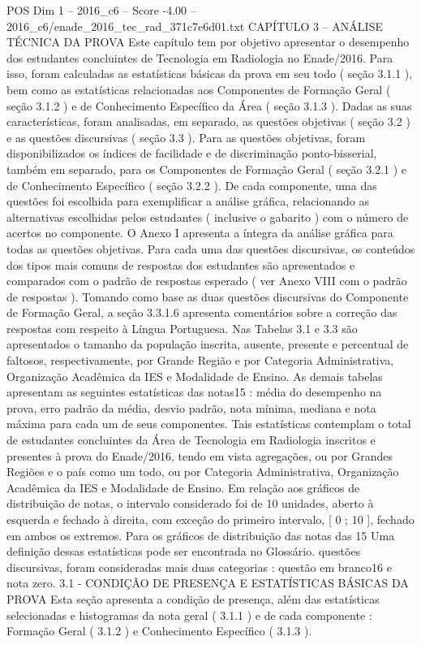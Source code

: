 \begin{textsample}{POS Dim 1 – 2016\_c6 – Score -4.00 – 2016\_c6/enade\_2016\_tec\_rad\_371c7e6d01.txt}  \label{ex:f1_pos_393}
CAPÍTULO 3 – ANÁLISE TÉCNICA DA PROVA Este capítulo tem por objetivo apresentar o desempenho dos estudantes concluintes de Tecnologia em Radiologia no Enade/2016.
Para isso, foram calculadas as estatísticas básicas da prova em seu todo ( seção 3.1.1 ), bem como as estatísticas relacionadas aos Componentes de Formação Geral ( seção 3.1.2 ) e de Conhecimento Específico da Área ( seção 3.1.3 ).
Dadas as suas características, foram analisadas, em separado, as questões objetivas ( seção 3.2 ) e as questões discursivas ( seção 3.3 ).
Para as questões objetivas, foram disponibilizados os índices de facilidade e de discriminação ponto-bisserial, também em separado, para os Componentes de Formação Geral ( seção 3.2.1 ) e de Conhecimento Específico ( seção 3.2.2 ).
De cada componente, uma das questões foi escolhida para exemplificar a análise gráfica, relacionando as alternativas escolhidas pelos estudantes ( inclusive o gabarito ) com o número de acertos no componente.
O Anexo I apresenta a íntegra da análise gráfica para todas as questões objetivas.
Para cada uma das questões discursivas, os conteúdos dos tipos mais comuns de respostas dos estudantes são apresentados e comparados com o padrão de respostas esperado ( ver Anexo VIII com o padrão de respostas ).
Tomando como base as duas questões discursivas do Componente de Formação Geral, a seção 3.3.1.6 apresenta comentários sobre a correção das respostas com respeito à Língua Portuguesa.
Nas Tabelas 3.1 e 3.3 são apresentados o tamanho da população inscrita, ausente, presente e percentual de faltosos, respectivamente, por Grande Região e por Categoria Administrativa, Organização Acadêmica da IES e Modalidade de Ensino.
As demais tabelas apresentam as seguintes estatísticas das notas15 : média do desempenho na prova, erro padrão da média, desvio padrão, nota mínima, mediana e nota máxima para cada um de seus componentes.
Tais estatísticas contemplam o total de estudantes concluintes da Área de Tecnologia em Radiologia inscritos e presentes à prova do Enade/2016, tendo em vista agregações, ou por Grandes Regiões e o país como um todo, ou por Categoria Administrativa, Organização Acadêmica da IES e Modalidade de Ensino.
Em relação aos gráficos de distribuição de notas, o intervalo considerado foi de 10 unidades, aberto à esquerda e fechado à direita, com exceção do primeiro intervalo, [ 0 ; 10 ], fechado em ambos os extremos.
Para os gráficos de distribuição das notas das 15 Uma definição dessas estatísticas pode ser encontrada no Glossário. questões discursivas, foram consideradas mais duas categorias : questão em branco16 e nota zero. 3.1 - CONDIÇÃO DE PRESENÇA E ESTATÍSTICAS BÁSICAS DA PROVA Esta seção apresenta a condição de presença, além das estatísticas selecionadas e histogramas da nota geral ( 3.1.1 ) e de cada componente : Formação Geral ( 3.1.2 ) e Conhecimento Específico ( 3.1.3 ).

\end{textsample}
